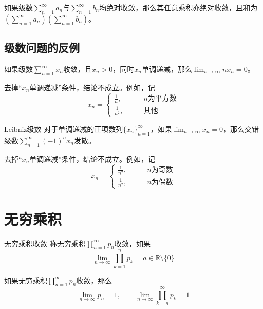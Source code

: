 \documentclass[lang = cn, scheme = chinese, thmcnt = section]{elegantbook}
\newcommand{\R}{\mathbb{R}}            %
\newcommand{\dis}{\displaystyle}
\begin{document}
\begin{theorem}
	如果级数$\dis \sum_{n=1}^{\infty}a_n$与$\dis \sum_{n=1}^{\infty}b_n$均绝对收敛，那么其任意乘积亦绝对收敛，且和为$\dis\left(\sum_{n=1}^{\infty}a_n\right)\left(\sum_{n=1}^{\infty}b_n\right)$。
\end{theorem}

\subsection{级数问题的反例}

\begin{theorem}
	如果级数$\dis \sum_{n=1}^{\infty}x_n$收敛，且$x_n>0$，同时$x_n$单调递减，那么$\dis \lim_{n\to\infty}nx_n=0$。
\end{theorem}

\begin{example}
	去掉“$x_n$单调递减”条件，结论不成立。例如，记
	$$
	x_n=\begin{cases}
		\frac{1}{n},\qquad & n\text{为平方数}\\
		\frac{1}{n^2},\qquad & \text{其他}
	\end{cases}
	$$
\end{example}

\begin{theorem}{Leibniz级数}
	对于单调递减的正项数列$\{x_n\}_{n=1}^{\infty}$，如果$\dis\lim_{n\to\infty} x_n=0$，那么交错级数$\dis \sum_{n=1}^{\infty}(-1)^nx_n$发散。
\end{theorem}

\begin{example}
	去掉“$x_n$单调递减”条件，结论不成立。例如，记
	$$
	x_n=\begin{cases}
		\frac{1}{n^2},\qquad & n\text{为奇数}\\
		\frac{1}{n^2},\qquad & n\text{为偶数}
	\end{cases}
	$$
\end{example}

\section{无穷乘积}

\begin{definition}{无穷乘积收敛}
	称无穷乘积$\dis \prod_{n=1}^{\infty}p_n$收敛，如果
	$$
	\lim_{n\to\infty}\prod_{k=1}^{n}p_k=a\in\R\setminus\{0\}
	$$
\end{definition}

\begin{theorem}
	如果无穷乘积$\dis \prod_{n=1}^{\infty}p_n$收敛，那么
	$$
	\lim_{n\to\infty}p_n=1,\qquad 
	\lim_{n\to\infty}\prod_{k=n}^{\infty}p_k=1
	$$
\end{theorem}
\end{document}
